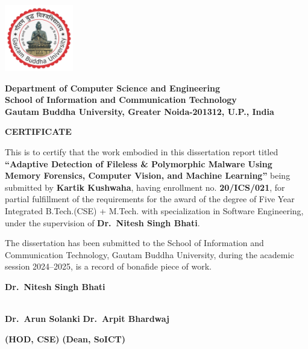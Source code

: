 
\begin{center}
\vspace*{-1.5cm}
        \includegraphics[width=3cm]{figures/GBU_logo.png} %

        {\normalsize\textbf{Department of Computer Science and Engineering\\
        School of Information and Communication Technology\\
        Gautam Buddha University,
        Greater Noida-201312, U.P., India}}\\  %

        \vspace{1cm} %

        {\LARGE \textbf{CERTIFICATE}} %

\end{center}
{
\setlength{\baselineskip}{20pt}

This is to certify that the work embodied in this dissertation report titled \textbf{``Adaptive Detection of Fileless \& Polymorphic Malware Using Memory Forensics, Computer Vision, and Machine Learning''} being submitted by \textbf{Kartik Kushwaha}, having enrollment no. \textbf{20/ICS/021}, for partial fulfillment of the requirements for the award of the degree of Five Year Integrated B.Tech.(CSE) + M.Tech. with specialization in Software Engineering, under the supervision of \textbf{Dr.~Nitesh Singh Bhati}.

The dissertation has been submitted to the School of Information and Communication Technology, Gautam Buddha University, during the academic session 2024–2025, is a record of bonafide piece of work.

\vspace{1cm} %
\begin{center}
    \vspace{1cm}
    \textbf{Dr.~Nitesh Singh Bhati} \\   \\
\end{center}
\vspace{1cm} %
\begin{flushleft}
    \textbf{Dr.~Arun Solanki}  \hfill{\textbf{Dr.~Arpit Bhardwaj}} \\
\end{flushleft}
\vspace{-1.5cm}
\begin{flushleft}
    \textbf{(HOD, CSE)}  \hfill{\textbf{(Dean, SoICT)}} \\
\end{flushleft}


}

\clearpage
